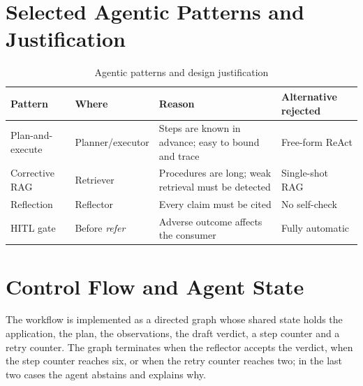 \documentclass[12pt,a4paper,oneside]{report}
\newif\ifguidance
\newcommand{\guide}[1]{%
  \ifguidance
  \begin{tcolorbox}[enhanced,breakable,colback=guidebg,colframe=bmsblue,
    boxrule=0.6pt,arc=2pt,left=6pt,right=6pt,top=4pt,bottom=4pt,
    fonttitle=\bfseries\small,title={What to write here},
    before upper={\small\setstretch{1.1}}]
  #1
  \end{tcolorbox}
  \fi}
\newcommand{\dodont}[2]{%
  \ifguidance
  \begin{tcolorbox}[enhanced,breakable,sidebyside,sidebyside align=top seam,
    colback=dobg,colbacklower=dontbg,colframe=gray!60,boxrule=0.5pt,arc=2pt,
    lefthand ratio=0.5,left=5pt,right=5pt,top=4pt,bottom=4pt,
    fontupper=\small\setstretch{1.05},fontlower=\small\setstretch{1.05}]
  \textbf{\textcolor{ForestGreen}{\checkmark\ Do}}
  \begin{itemize}[leftmargin=12pt,itemsep=1pt,topsep=2pt]#1\end{itemize}
  \tcblower
  \textbf{\textcolor{BrickRed}{$\times$ Don't}}
  \begin{itemize}[leftmargin=12pt,itemsep=1pt,topsep=2pt]#2\end{itemize}
  \end{tcolorbox}
  \fi}
\newenvironment{sample}
  {\par\noindent{\footnotesize\bfseries\textcolor{BrickRed}{[SAMPLE --- replace with your own content]}}\par\color{samplecol}}
  {\par\medskip}
\begin{document}
\section{Selected Agentic Patterns and Justification}
\guide{Name each pattern (ReAct, plan-and-execute, reflection, corrective RAG, supervisor multi-agent,
etc.), explain why you chose it, and state which alternative you rejected and why.}
\dodont{\item Present a short table: pattern, where used, why chosen, alternative rejected.}
{\item Do not list patterns only because they are popular.}
\begin{sample}
\begin{table}[H]
\centering
\caption{Agentic patterns and design justification}
\label{tab:patterns}
\small
\begin{tabularx}{\linewidth}{@{}l l >{\raggedright\arraybackslash}X l@{}}
\toprule
\textbf{Pattern} & \textbf{Where} & \textbf{Reason} & \textbf{Alternative rejected} \\ \midrule
Plan-and-execute & Planner/executor & Steps are known in advance; easy to bound and trace & Free-form ReAct \\
Corrective RAG & Retriever & Procedures are long; weak retrieval must be detected & Single-shot RAG \\
Reflection & Reflector & Every claim must be cited & No self-check \\
HITL gate & Before \emph{refer} & Adverse outcome affects the consumer & Fully automatic \\
\bottomrule
\end{tabularx}
\end{table}
\end{sample}

\section{Control Flow and Agent State}
\guide{Describe how control moves between components (a state machine or graph is ideal) and what is
stored in the shared state. Show how and where loops terminate.}
\dodont{\item Name every termination condition.
\item List the fields of the shared state.
}
{\item Do not leave any loop without an upper bound.
}
\begin{sample}
The workflow is implemented as a directed graph whose shared state holds the application, the plan,
the observations, the draft verdict, a step counter and a retry counter. The graph terminates when the
reflector accepts the verdict, when the step counter reaches six, or when the retry counter reaches two;
in the last two cases the agent abstains and explains why.
\end{sample}
\end{document}
